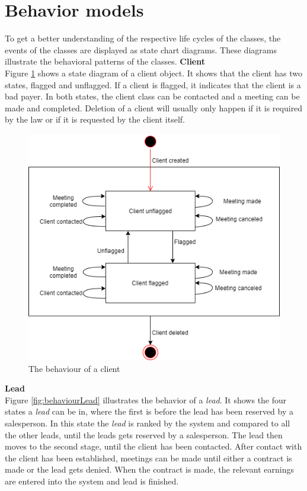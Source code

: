 \section{Behavior models}
To get a better understanding of the respective life cycles of the classes, the events of the classes are displayed as state chart diagrams. These diagrams illustrate the behavioral patterns of the classes. 
\newline \newline \noindent
\textbf{Client}
\\
Figure \ref{fig:behaviourClient} shows a state diagram of a client object. It shows that the client has two states, flagged and unflagged. If a client is flagged, it indicates that the client is a bad payer. In both states, the client class can be contacted and a meeting can be made and completed.
Deletion of a client will usually only happen if it is required by the law or if it is requested by the client itself.
 
\begin{figure}[H]
    \centering
    \includegraphics[scale=0.8, clip]{figures/Behaviors/BehaviorClient.png}
    \caption{The behaviour of a client }
    \label{fig:behaviourClient}
\end{figure}
\noindent
\noindent
\textbf{Lead}
\\
Figure \ref{fig:behaviourLead} illustrates the behavior of a \textit{lead}. It shows the four states a \textit{lead} can be in, where the first is before the lead has been reserved by a salesperson. In this state the \textit{lead} is ranked by the system and compared to all the other leads, until the leads gets reserved by a salesperson. The lead then moves to the second stage, until the client has been contacted. After contact with the client has been established, meetings can be made until either a contract is made or the lead gets denied. When the contract is made, the relevant earnings are entered into the system and lead is finished.

